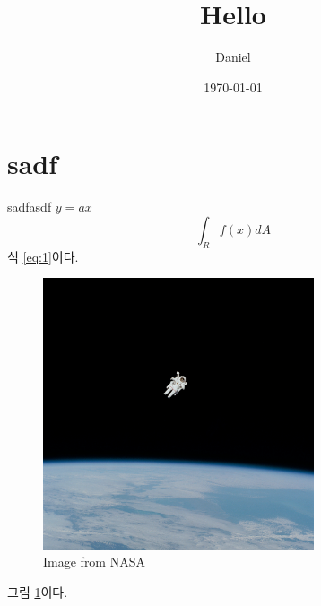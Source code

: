 \documentclass{article}
\title{Hello}
\author{Daniel}
\date{\today}
\begin{document}
	\maketitle
	\tableofcontents
	\section{sadf}
	sadfasdf $y = ax$
	\begin{equation}
	\int_R f(x)dA\label{eq:1}
	\end{equation}
	식 \ref{eq:1}이다.

	\begin{figure}
		\includegraphics[width=8cm]{nasa.jpg}
		\caption{Image from NASA}\label{fig:1}
	\end{figure}
	그림 \ref{fig:1}이다.
\end{document}
